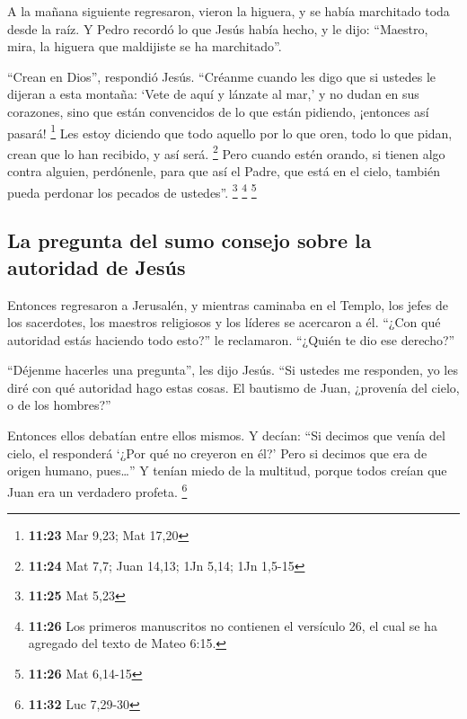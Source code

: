  A la mañana siguiente regresaron, vieron la higuera, y
se había marchitado toda desde la raíz.  Y Pedro recordó
lo que Jesús había hecho, y le dijo: ``Maestro, mira, la higuera que
maldijiste se ha marchitado''.

 ``Crean en Dios'', respondió Jesús. 
``Créanme cuando les digo que si ustedes le dijeran a esta montaña:
`Vete de aquí y lánzate al mar,' y no dudan en sus corazones, sino que
están convencidos de lo que están pidiendo, ¡entonces así pasará!
\footnote{\textbf{11:23} Mar 9,23; Mat 17,20}  Les estoy
diciendo que todo aquello por lo que oren, todo lo que pidan, crean que
lo han recibido, y así será. \footnote{\textbf{11:24} Mat 7,7; Juan
  14,13; 1Jn 5,14; 1Jn 1,5-15}  Pero cuando estén orando,
si tienen algo contra alguien, perdónenle, para que así el Padre, que
está en el cielo, también pueda perdonar los pecados de ustedes''.
\footnote{\textbf{11:25} Mat 5,23}  \footnote{\textbf{11:26}
  Los primeros manuscritos no contienen el versículo 26, el cual se ha
  agregado del texto de Mateo 6:15.} \footnote{\textbf{11:26} Mat
  6,14-15}

\hypertarget{la-pregunta-del-sumo-consejo-sobre-la-autoridad-de-jesuxfas}{%
\subsection{La pregunta del sumo consejo sobre la autoridad de
Jesús}\label{la-pregunta-del-sumo-consejo-sobre-la-autoridad-de-jesuxfas}}

 Entonces regresaron a Jerusalén, y mientras caminaba en
el Templo, los jefes de los sacerdotes, los maestros religiosos y los
líderes se acercaron a él.  ``¿Con qué autoridad estás
haciendo todo esto?'' le reclamaron. ``¿Quién te dio ese derecho?''

 ``Déjenme hacerles una pregunta'', les dijo Jesús. ``Si
ustedes me responden, yo les diré con qué autoridad hago estas cosas.
 El bautismo de Juan, ¿provenía del cielo, o de los
hombres?''

 Entonces ellos debatían entre ellos mismos. Y decían:
``Si decimos que venía del cielo, el responderá `¿Por qué no creyeron en
él?'  Pero si decimos que era de origen humano,
pues\ldots{}'' Y tenían miedo de la multitud, porque todos creían que
Juan era un verdadero profeta. \footnote{\textbf{11:32} Luc 7,29-30}

